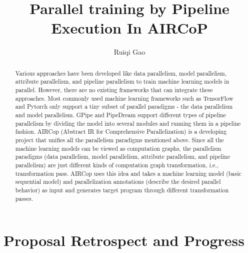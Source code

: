 \documentclass[sigplan, nonacm]{acmart}\settopmatter{printfolios=true,printccs=false,printacmref=false}
\begin{document}
\sloppy

\title{Parallel training by Pipeline Execution In AIRCoP}

\author{Ruiqi Gao}

\begin{abstract}
  Various approaches have been developed like data parallelism, model parallelism, attribute parallelism, and pipeline parallelism to train machine learning models in parallel. However, there are no existing frameworks that can integrate these approaches. Most commonly used machine learning frameworks such as TensorFlow and Pytorch only support a tiny subset of parallel paradigms - the data parallelism and model parallelism. GPipe and PipeDream support different types of pipeline parallelism by dividing the model into several modules and running them in a pipeline fashion.
  AIRCop (Abstract IR for Comprehensive Parallelization) is a developing project that unifies all the parallelism paradigms mentioned above. Since all the machine learning models can be viewed as computation graphs, the parallelism paradigms (data parallelism, model parallelism, attribute parallelism, and pipeline parallelism) are just different kinds of computation graph transformation, i.e., transformation pass. AIRCop uses this idea and takes a machine learning model (basic sequential model) and parallelization annotations (describe the desired parallel behavior) as input and generates target program through different transformation passes.

\end{abstract}


\maketitle
\section{Proposal Retrospect and Progress}
\end{document}
